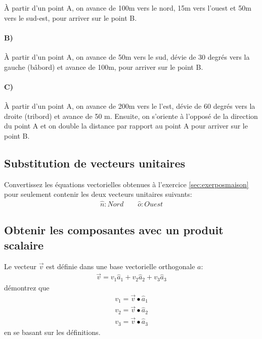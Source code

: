 À partir d'un point A, on avance de 100m vers le nord, 15m vers l'ouest et 50m vers le sud-est, pour arriver sur le point B.

\paragraph{B)} 

À partir d'un point A, on avance de 50m vers le sud, dévie de 30 degrés vers la gauche (bâbord) et avance de 100m, pour arriver sur le point B. 


\paragraph{C)} 

À partir d'un point A, on avance de 200m vers le l'est, dévie de 60 degrés vers la droite (tribord) et avance de 50 m. Ensuite, on s'oriente à l'opposé de la direction du point A et on double la distance par rapport au point A pour arriver sur le point B.
 

\subsection{Substitution de vecteurs unitaires}

Convertissez les équations vectorielles obtenues à l’exercice \ref{sec:exerposmaison} pour seulement contenir les deux vecteurs unitaires suivants:
\begin{align}
\hat{n} : Nord \quad\quad   \hat{o} : Ouest
\end{align} 



\subsection{Obtenir les composantes avec un produit scalaire}

Le vecteur $\vec{v}$ est définie dans une base vectorielle orthogonale $a$:
\begin{align}
\vec{v} = v_1 \hat{a}_1 + v_2 \hat{a}_2 + v_3 \hat{a}_3
\end{align} 
démontrez que 
\begin{align}
v_1 = \vec{v} \bullet \hat{a}_1 \\
v_2 = \vec{v} \bullet \hat{a}_2 \\
v_3 = \vec{v} \bullet \hat{a}_3 
\end{align} 
en se basant sur les définitions.


